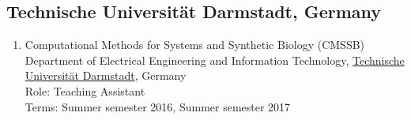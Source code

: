\documentclass[11pt,a4paper,sans]{moderncv}        %
\begin{document}
\subsection{Technische Universit\"at Darmstadt, Germany}
\begin{enumerate}
	\item Computational Methods for Systems and Synthetic Biology (CMSSB) \\Department of Electrical Engineering and Information Technology, \href{http://www.tu-darmstadt.de/index.en.jsp}{Technische Universit\"{a}t Darmstadt}, Germany\\Role: Teaching Assistant\\Terms: Summer semester 2016, Summer semester 2017
\end{enumerate}


%
\end{document}
